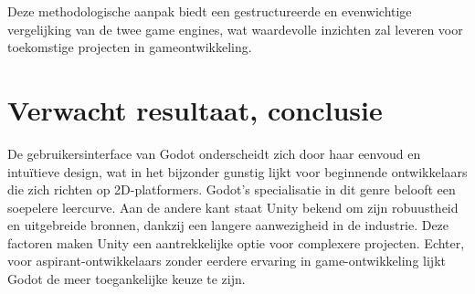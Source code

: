 Deze methodologische aanpak biedt een gestructureerde en evenwichtige vergelijking van de twee game engines, wat waardevolle inzichten zal leveren voor toekomstige projecten in gameontwikkeling.


\section{Verwacht resultaat, conclusie}%
\label{sec:verwachte_resultaten}

De gebruikersinterface van Godot onderscheidt zich door haar eenvoud en intuïtieve design, wat in het bijzonder gunstig lijkt voor beginnende ontwikkelaars die zich richten op 2D-platformers. Godot's specialisatie in dit genre belooft een soepelere leercurve. Aan de andere kant staat Unity bekend om zijn robuustheid en uitgebreide bronnen, dankzij een langere aanwezigheid in de industrie. Deze factoren maken Unity een aantrekkelijke optie voor complexere projecten. Echter, voor aspirant-ontwikkelaars zonder eerdere ervaring in game-ontwikkeling lijkt Godot de meer toegankelijke keuze te zijn.


